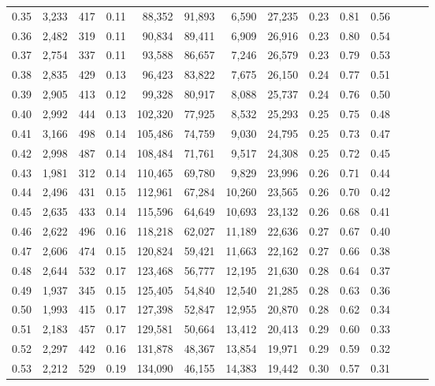 \begin{tabular}{rrrrrrrrrrrrrr}
0.35 &  3,233 &  417 &  0.11 &   88,352 &   91,893 &   6,590 &  27,235 &  0.23 &  0.81 &      0.56 \\
0.36 &  2,482 &  319 &  0.11 &   90,834 &   89,411 &   6,909 &  26,916 &  0.23 &  0.80 &      0.54 \\
0.37 &  2,754 &  337 &  0.11 &   93,588 &   86,657 &   7,246 &  26,579 &  0.23 &  0.79 &      0.53 \\
0.38 &  2,835 &  429 &  0.13 &   96,423 &   83,822 &   7,675 &  26,150 &  0.24 &  0.77 &      0.51 \\
0.39 &  2,905 &  413 &  0.12 &   99,328 &   80,917 &   8,088 &  25,737 &  0.24 &  0.76 &      0.50 \\
0.40 &  2,992 &  444 &  0.13 &  102,320 &   77,925 &   8,532 &  25,293 &  0.25 &  0.75 &      0.48 \\
0.41 &  3,166 &  498 &  0.14 &  105,486 &   74,759 &   9,030 &  24,795 &  0.25 &  0.73 &      0.47 \\
0.42 &  2,998 &  487 &  0.14 &  108,484 &   71,761 &   9,517 &  24,308 &  0.25 &  0.72 &      0.45 \\
0.43 &  1,981 &  312 &  0.14 &  110,465 &   69,780 &   9,829 &  23,996 &  0.26 &  0.71 &      0.44 \\
0.44 &  2,496 &  431 &  0.15 &  112,961 &   67,284 &  10,260 &  23,565 &  0.26 &  0.70 &      0.42 \\
0.45 &  2,635 &  433 &  0.14 &  115,596 &   64,649 &  10,693 &  23,132 &  0.26 &  0.68 &      0.41 \\
0.46 &  2,622 &  496 &  0.16 &  118,218 &   62,027 &  11,189 &  22,636 &  0.27 &  0.67 &      0.40 \\
0.47 &  2,606 &  474 &  0.15 &  120,824 &   59,421 &  11,663 &  22,162 &  0.27 &  0.66 &      0.38 \\
0.48 &  2,644 &  532 &  0.17 &  123,468 &   56,777 &  12,195 &  21,630 &  0.28 &  0.64 &      0.37 \\
0.49 &  1,937 &  345 &  0.15 &  125,405 &   54,840 &  12,540 &  21,285 &  0.28 &  0.63 &      0.36 \\
0.50 &  1,993 &  415 &  0.17 &  127,398 &   52,847 &  12,955 &  20,870 &  0.28 &  0.62 &      0.34 \\
0.51 &  2,183 &  457 &  0.17 &  129,581 &   50,664 &  13,412 &  20,413 &  0.29 &  0.60 &      0.33 \\
0.52 &  2,297 &  442 &  0.16 &  131,878 &   48,367 &  13,854 &  19,971 &  0.29 &  0.59 &      0.32 \\
0.53 &  2,212 &  529 &  0.19 &  134,090 &   46,155 &  14,383 &  19,442 &  0.30 &  0.57 &      0.31 \\

\end{tabular}
